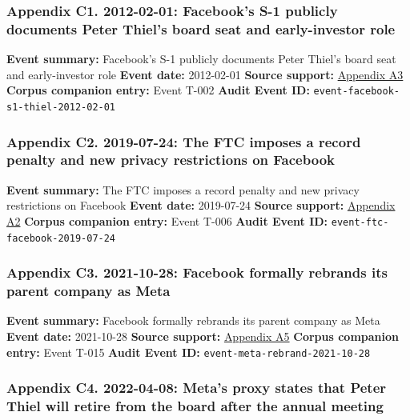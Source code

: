 \documentclass[
  american,
  11pt,
  letterpaper,
]{article}
\begin{document}
\subsubsection{Appendix C1. 2012-02-01: Facebook's S-1 publicly
documents Peter Thiel's board seat and early-investor
role}\label{ch-01-appendix-c1-2012-02-01-facebook-s-s-1-publicly-documents-peter-thiel-s-board-seat-and-early-investor-role}

\textbf{Event summary:} Facebook's S-1 publicly documents Peter Thiel's
board seat and early-investor role \textbf{Event date:} 2012-02-01
\textbf{Source support:}
\hyperref[ch-01-appendix-a3-facebook-inc-registration-statement-on-form-s-1]{Appendix
A3} \textbf{Corpus companion entry:} Event T-002 \textbf{Audit Event
ID:} \texttt{event-facebook-s1-thiel-2012-02-01}

\subsubsection{Appendix C2. 2019-07-24: The FTC imposes a record penalty
and new privacy restrictions on
Facebook}\label{ch-01-appendix-c2-2019-07-24-the-ftc-imposes-a-record-penalty-and-new-privacy-restrictions-on-facebook}

\textbf{Event summary:} The FTC imposes a record penalty and new privacy
restrictions on Facebook \textbf{Event date:} 2019-07-24 \textbf{Source
support:}
\hyperref[ch-01-appendix-a2-ftc-imposes-5-billion-penalty-and-sweeping-new-privacy-restrictions-on-facebook]{Appendix
A2} \textbf{Corpus companion entry:} Event T-006 \textbf{Audit Event
ID:} \texttt{event-ftc-facebook-2019-07-24}

\subsubsection{Appendix C3. 2021-10-28: Facebook formally rebrands its
parent company as
Meta}\label{ch-01-appendix-c3-2021-10-28-facebook-formally-rebrands-its-parent-company-as-meta}

\textbf{Event summary:} Facebook formally rebrands its parent company as
Meta \textbf{Event date:} 2021-10-28 \textbf{Source support:}
\hyperref[ch-01-appendix-a5-the-facebook-company-is-now-meta]{Appendix
A5} \textbf{Corpus companion entry:} Event T-015 \textbf{Audit Event
ID:} \texttt{event-meta-rebrand-2021-10-28}

\subsubsection{Appendix C4. 2022-04-08: Meta's proxy states that Peter
Thiel will retire from the board after the annual
meeting}\label{ch-01-appendix-c4-2022-04-08-meta-s-proxy-states-that-peter-thiel-will-retire-from-the-board-after-the-annual-meeting}
\end{document}
